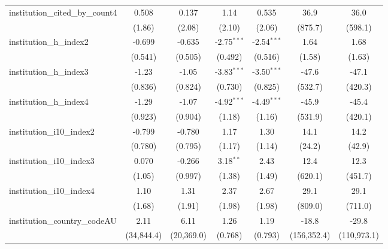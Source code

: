 \begin{tabular}{lcccccc}
   institution\_cited\_by\_count4        & 0.508        & 0.137        & 1.14          & 0.535         & 36.9        & 36.0\\   
                                         & (1.86)       & (2.08)       & (2.10)        & (2.06)        & (875.7)     & (598.1)\\   
   institution\_h\_index2                & -0.699       & -0.635       & -2.75$^{***}$ & -2.54$^{***}$ & 1.64        & 1.68\\   
                                         & (0.541)      & (0.505)      & (0.492)       & (0.516)       & (1.58)      & (1.63)\\   
   institution\_h\_index3                & -1.23        & -1.05        & -3.83$^{***}$ & -3.50$^{***}$ & -47.6       & -47.1\\   
                                         & (0.836)      & (0.824)      & (0.730)       & (0.825)       & (532.7)     & (420.3)\\   
   institution\_h\_index4                & -1.29        & -1.07        & -4.92$^{***}$ & -4.49$^{***}$ & -45.9       & -45.4\\   
                                         & (0.923)      & (0.904)      & (1.18)        & (1.16)        & (531.9)     & (420.1)\\   
   institution\_i10\_index2              & -0.799       & -0.780       & 1.17          & 1.30          & 14.1        & 14.2\\   
                                         & (0.780)      & (0.795)      & (1.17)        & (1.14)        & (24.2)      & (42.9)\\   
   institution\_i10\_index3              & 0.070        & -0.266       & 3.18$^{**}$   & 2.43          & 12.4        & 12.3\\   
                                         & (1.05)       & (0.997)      & (1.38)        & (1.49)        & (620.1)     & (451.7)\\   
   institution\_i10\_index4              & 1.10         & 1.31         & 2.37          & 2.67          & 29.1        & 29.1\\   
                                         & (1.68)       & (1.91)       & (1.98)        & (1.98)        & (809.0)     & (711.0)\\   
   institution\_country\_codeAU          & 2.11         & 6.11         & 1.26          & 1.19          & -18.8       & -29.8\\   
                                         & (34,844.4)   & (20,369.0)   & (0.768)       & (0.793)       & (156,352.4) & (110,973.1)\\   

\end{tabular}
